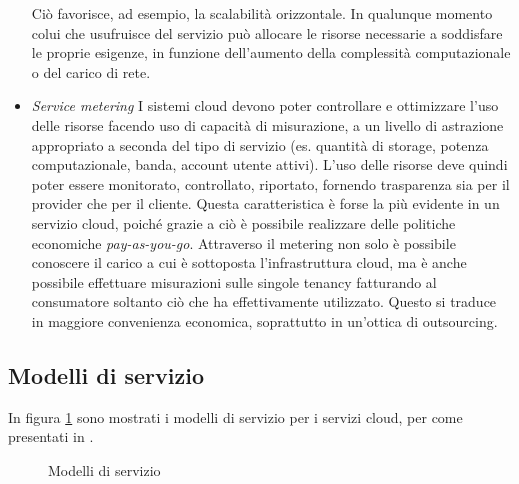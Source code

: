 \documentclass[../main.tex]{subfiles}
\begin{document}
\begin{itemize}
Ciò favorisce, ad esempio, la scalabilità orizzontale. In qualunque momento colui che usufruisce del servizio può allocare le risorse necessarie a soddisfare le proprie esigenze, in funzione dell'aumento della complessità computazionale o del carico di rete.
\item \textit{Service metering} I sistemi cloud devono poter controllare e ottimizzare l'uso delle risorse facendo uso di capacità di misurazione, a un livello di astrazione appropriato a seconda del tipo di servizio (es. quantità di storage, potenza computazionale, banda, account utente attivi). L'uso delle risorse deve quindi poter essere monitorato, controllato, riportato, fornendo trasparenza sia per il provider che per il cliente.
Questa caratteristica è forse la più evidente in un servizio cloud, poiché grazie a ciò è possibile realizzare delle politiche economiche \textit{pay-as-you-go}.
Attraverso il metering non solo è possibile conoscere il carico a cui è sottoposta l'infrastruttura cloud, ma è anche possibile effettuare misurazioni sulle singole tenancy fatturando al consumatore soltanto ciò che ha effettivamente utilizzato.
Questo si traduce in maggiore convenienza economica, soprattutto in un'ottica di outsourcing.
\end{itemize}
\subsection{Modelli di servizio}
In figura \ref{fig:modelliservizio} sono mostrati i modelli di servizio per i servizi cloud, per come presentati in \cite{NISTCloud}.
\begin{figure}[H]
\centering
{}
\caption{Modelli di servizio}\label{fig:modelliservizio}
\end{figure}
\end{document}
